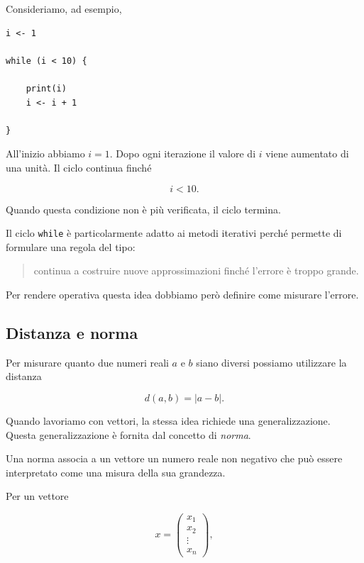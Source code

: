 Consideriamo, ad esempio,

\begin{verbatim}
i <- 1

while (i < 10) {

    print(i)
    i <- i + 1

}
\end{verbatim}

All'inizio abbiamo $i=1$. Dopo ogni iterazione il valore di $i$
viene aumentato di una unità. Il ciclo continua finché

\begin{equation*}
    i<10.
\end{equation*}

Quando questa condizione non è più verificata, il ciclo termina.

Il ciclo \texttt{while} è particolarmente adatto ai metodi
iterativi perché permette di formulare una regola del tipo:

\begin{quote}
continua a costruire nuove approssimazioni finché l'errore è
troppo grande.
\end{quote}

Per rendere operativa questa idea dobbiamo però definire come
misurare l'errore.


\subsection{Distanza e norma}

Per misurare quanto due numeri reali $a$ e $b$ siano diversi
possiamo utilizzare la distanza

\begin{equation*}
    d(a,b)=|a-b|.
\end{equation*}

Quando lavoriamo con vettori, la stessa idea richiede una
generalizzazione. Questa generalizzazione è fornita dal concetto
di \emph{norma}.

Una norma associa a un vettore un numero reale non negativo che
può essere interpretato come una misura della sua grandezza.

Per un vettore

\begin{equation*}
    x=
    \begin{pmatrix}
        x_1\\
        x_2\\
        \vdots\\
        x_n
    \end{pmatrix},
\end{equation*}

